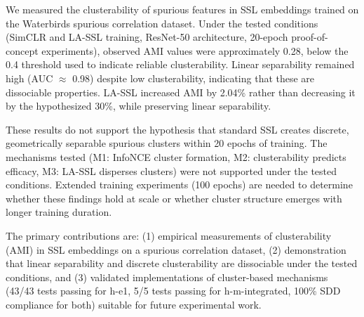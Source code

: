 
We measured the clusterability of spurious features in SSL embeddings trained on the Waterbirds spurious correlation dataset. Under the tested conditions (SimCLR and LA-SSL training, ResNet-50 architecture, 20-epoch proof-of-concept experiments), observed AMI values were approximately 0.28, below the 0.4 threshold used to indicate reliable clusterability. Linear separability remained high (AUC $\approx$ 0.98) despite low clusterability, indicating that these are dissociable properties. LA-SSL increased AMI by 2.04\% rather than decreasing it by the hypothesized 30\%, while preserving linear separability.

These results do not support the hypothesis that standard SSL creates discrete, geometrically separable spurious clusters within 20 epochs of training. The mechanisms tested (M1: InfoNCE cluster formation, M2: clusterability predicts efficacy, M3: LA-SSL disperses clusters) were not supported under the tested conditions. Extended training experiments (100 epochs) are needed to determine whether these findings hold at scale or whether cluster structure emerges with longer training duration.

The primary contributions are: (1) empirical measurements of clusterability (AMI) in SSL embeddings on a spurious correlation dataset, (2) demonstration that linear separability and discrete clusterability are dissociable under the tested conditions, and (3) validated implementations of cluster-based mechanisms (43/43 tests passing for h-e1, 5/5 tests passing for h-m-integrated, 100\% SDD compliance for both) suitable for future experimental work.
